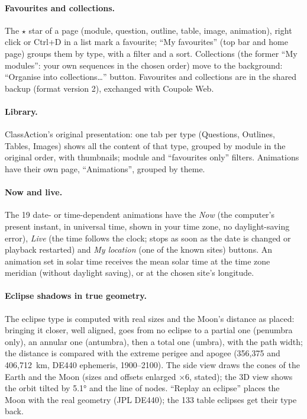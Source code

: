 \paragraph{Favourites and collections.} The $\star$ star of a page (module, question, outline, table, image,
animation), right click or Ctrl+D in a list mark a favourite; “My favourites” (top bar and home page) groups them by
type, with a filter and a sort. Collections (the former “My modules”: your own sequences in the chosen order) move to
the background: “Organise into collections\dots{}” button. Favourites and collections are in the shared backup (format
version 2), exchanged with Coupole Web.

\paragraph{Library.} ClassAction's original presentation: one tab per type (Questions, Outlines, Tables, Images)
shows all the content of that type, grouped by module in the original order, with thumbnails; module and “favourites
only” filters. Animations have their own page, “Animations”, grouped by theme.

\paragraph{Now and live.} The 19 date- or time-dependent animations have the \emph{Now} (the computer's present instant,
in universal time, shown in your time zone, no daylight-saving error), \emph{Live} (the time follows the clock; stops as
soon as the date is changed or playback restarted) and \emph{My location} (one of the known sites) buttons. An
animation set in solar time receives the mean solar time at the time zone meridian (without daylight saving), or at the
chosen site's longitude.

\paragraph{Eclipse shadows in true geometry.} The eclipse type is computed with real sizes and the Moon's distance as
placed: bringing it closer, well aligned, goes from no eclipse to a partial one (penumbra only), an annular one
(antumbra), then a total one (umbra), with the path width; the distance is compared with the extreme perigee and apogee
(356,375 and 406,712~km, DE440 ephemeris, 1900--2100). The side view draws the cones of the Earth and the Moon (sizes
and offsets enlarged $\times$6, stated); the 3D view shows the orbit tilted by 5.1° and the line of nodes. “Replay an
eclipse” places the Moon with the real geometry (JPL DE440); the 133 table eclipses get their type back.


